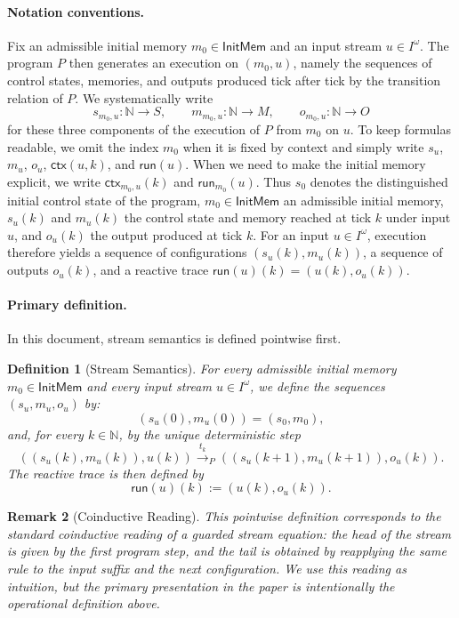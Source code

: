 \documentclass[11pt,a4paper]{article}
\newtheorem{definition}{Definition}[section]
\newtheorem{remark}[definition]{Remark}
\newcommand{\Nat}{\mathbb{N}}
\newcommand{\Stream}[1]{#1^\omega}
\newcommand{\run}{\mathsf{run}}
\newcommand{\ctx}{\mathsf{ctx}}
\begin{document}
\paragraph{Notation conventions.}
Fix an admissible initial memory \(m_0 \in \mathsf{InitMem}\) and an input stream
\(u \in \Stream{I}\). The program \(P\) then generates an execution on
\((m_0,u)\), namely the sequences of control states, memories, and outputs
produced tick after tick by the transition relation of \(P\). We
systematically write
\[
s_{m_0,u} : \Nat \to S,\qquad m_{m_0,u} : \Nat \to M,\qquad o_{m_0,u} : \Nat \to O
\]
for these three components of the execution of \(P\) from \(m_0\) on \(u\). To
keep formulas readable, we omit the index \(m_0\) when it is fixed by context
and simply write \(s_u\), \(m_u\), \(o_u\), \(\ctx(u,k)\), and \(\run(u)\).
When we need to make the initial memory explicit, we write
\(\ctx_{m_0,u}(k)\) and \(\run_{m_0}(u)\).
Thus \(s_0\) denotes the distinguished initial control state of the program,
\(m_0 \in \mathsf{InitMem}\) an admissible initial memory, \(s_u(k)\) and
\(m_u(k)\) the control state and memory reached at tick \(k\) under input
\(u\), and \(o_u(k)\) the output produced at tick \(k\). For an input
\(u \in \Stream{I}\), execution therefore yields a sequence of configurations
\((s_u(k),m_u(k))\), a sequence of outputs \(o_u(k)\), and a reactive trace
\(\run(u)(k) = (u(k),o_u(k))\).

\paragraph{Primary definition.}
In this document, stream semantics is defined pointwise first.

\begin{definition}[Stream Semantics]
For every admissible initial memory \(m_0 \in \mathsf{InitMem}\) and every input
stream \(u \in \Stream{I}\), we define the sequences \((s_u,m_u,o_u)\) by:
\[
(s_u(0),m_u(0)) = (s_0,m_0),
\]
and, for every \(k \in \Nat\), by the unique deterministic step
\[
((s_u(k),m_u(k)),u(k)) \xrightarrow{\,t_k\,}_P ((s_u(k+1),m_u(k+1)),o_u(k)).
\]
The reactive trace is then defined by
\[
\run(u)(k) := (u(k),o_u(k)).
\]
\end{definition}

\begin{remark}[Coinductive Reading]
This pointwise definition corresponds to the standard coinductive reading of a
guarded stream equation: the head of the stream is given by the first program
step, and the tail is obtained by reapplying the same rule to the input suffix
and the next configuration. We use this reading as intuition, but the primary
presentation in the paper is intentionally the operational definition above.
\end{remark}
\end{document}
